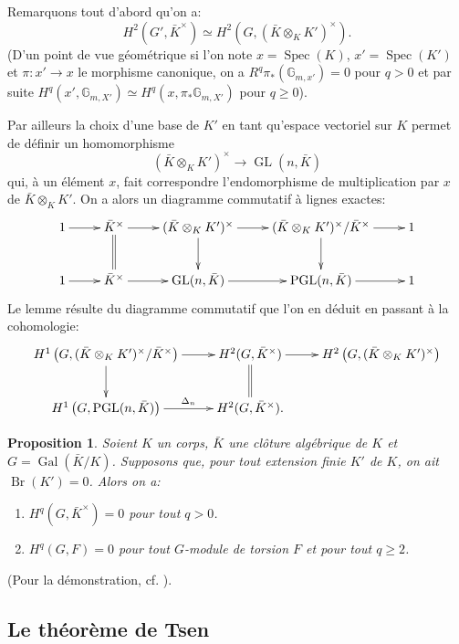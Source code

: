 \documentclass{article}
\DeclareMathOperator{\br}{Br}
\DeclareMathOperator{\gal}{Gal}
\DeclareMathOperator{\gl}{GL}
\DeclareMathOperator{\pgl}{PGL}
\DeclareMathOperator{\spec}{Spec}
\newcommand{\dG}{\mathbb{G}}
\newtheorem{proposition}[subsubsection]{Proposition}
\begin{document}
Remarquons tout d'abord qu'on a: 
\[
  H^2(G',\bar K^\times) \simeq H^2\left(G,(\bar K\otimes_K K')^\times\right)\text{.}
\]
(D'un point de vue géométrique si l'on note $x=\spec(K)$, $x'=\spec(K')$ et 
$\pi:x'\to x$ le morphisme canonique, on a $R^q \pi_*(\dG_{m,x'}) = 0$ pour 
$q>0$ et par suite $H^q(x',\dG_{m,X'})\simeq H^q(x,\pi_*\dG_{m,X'})$ pour 
$q\geqslant 0$). 

Par ailleurs la choix d'une base de $K'$ en tant qu'espace vectoriel sur $K$ 
permet de définir un homomorphisme 
\[
  (\bar K\otimes_K K')^\times \to \gl(n,\bar K)
\]
qui, à un élément $x$, fait correspondre l'endomorphisme de 
multiplication par $x$ de $\bar K\otimes_K K'$. On a alors un diagramme 
commutatif à lignes exactes: 
\[\xymatrix{
  1 \ar[r] 
    & \bar K^\times \ar[r] \ar@{=}[d]
    & (\bar K\otimes_K K')^\times \ar[r] \ar[d] 
    & (\bar K\otimes_K K')^\times / \bar K^\times \ar[r] \ar[d] 
    & 1 \\
  1 \ar[r] 
    & \bar K^\times \ar[r] 
    & \gl(n,\bar K) \ar[r] 
    & \pgl(n,\bar K) \ar[r] 
    & 1
}\]
Le lemme résulte du diagramme commutatif que l'on en déduit en passant 
à la cohomologie:
\[\xymatrix{
  H^1\left(G,(\bar K\otimes_K K')^\times/\bar K^\times\right) \ar[r] \ar[d] 
    & H^2(G,\bar K^\times) \ar[r] \ar@{=}[d]
    & H^2\left(G,(\bar K\otimes_K K')^\times\right) \\
  H^1\left(G,\pgl(n,\bar K)\right) \ar[r]^-{\Delta_n} 
    & H^2(G,\bar K^\times) \text{.}
}\]





\begin{proposition}\label{3-1-6}
Soient $K$ un corps, $\bar K$ une clôture algébrique de $K$ et 
$G=\gal(\bar K/K)$. Supposons que, pour tout extension finie $K'$ de $K$, on 
ait $\br(K')=0$. Alors on a:
\begin{enumerate}[\indent i)]
  \item $H^q(G,\bar K^\times) = 0$ pour tout $q>0$.
  \item $H^q(G,F) = 0$ pour tout $G$-module de torsion $F$ et pour tout 
    $q\geqslant 2$.
\end{enumerate}
\end{proposition}

(Pour la démonstration, cf. \cite{14}).










\subsection{Le théorème de Tsen}\label{3-2}
\end{document}
